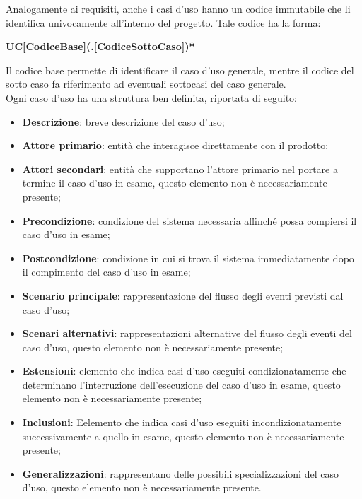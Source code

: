 Analogamente ai requisiti, anche i casi d'uso hanno un codice immutabile che li identifica univocamente all'interno del progetto. Tale codice ha la forma:
\begin{center}
    \textbf{UC[CodiceBase](.[CodiceSottoCaso])*}
\end{center}
Il codice base permette di identificare il caso d'uso generale, mentre il codice del sotto caso fa riferimento ad eventuali sottocasi del caso generale.\\
Ogni caso d'uso ha una struttura ben definita, riportata di seguito:
\begin{itemize}
    \item \textbf{Descrizione}: breve descrizione del caso d'uso;
    \item \textbf{Attore primario}: entità che interagisce direttamente con il prodotto;
    \item \textbf{Attori secondari}: entità che supportano l'attore primario nel portare a termine il caso d'uso in 
    esame, questo elemento non è necessariamente presente;
    \item \textbf{Precondizione}: condizione del sistema necessaria affinché possa compiersi il caso d'uso in esame;
    \item \textbf{Postcondizione}: condizione in cui si trova il sistema immediatamente dopo il compimento del caso 
    d'uso in esame;
    \item \textbf{Scenario principale}: rappresentazione del flusso degli eventi previsti dal caso d'uso;
    \item \textbf{Scenari alternativi}: rappresentazioni alternative del flusso degli eventi del caso d'uso, questo 
    elemento non è necessariamente presente;
    \item \textbf{Estensioni}: elemento che indica casi d'uso eseguiti condizionatamente che determinano l'interruzione 
    dell'esecuzione del caso d'uso in esame, questo elemento non è necessariamente presente;
    \item \textbf{Inclusioni}: Eelemento che indica casi d'uso eseguiti incondizionatamente successivamente a quello in 
    esame, questo elemento non è necessariamente presente;
    \item \textbf{Generalizzazioni}: rappresentano delle possibili specializzazioni del caso d'uso, questo elemento non è necessariamente presente.
\end{itemize}

